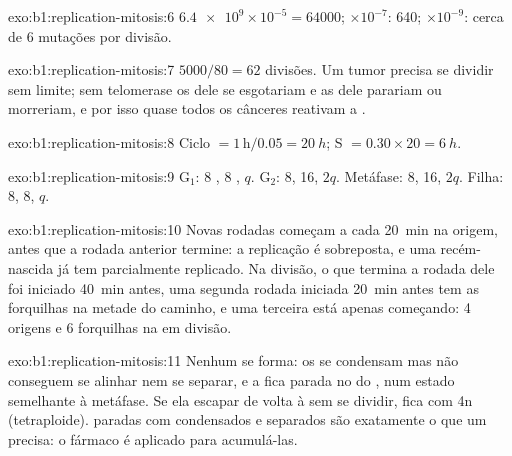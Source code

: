 \begin{solution}{exo:b1:replication-mitosis:6}
$\num{6.4e9}\times 10^{-5} = \num{64000}$; $\times 10^{-7}$: 640;
$\times 10^{-9}$: cerca de 6 mutações por divisão.
\end{solution}

\begin{solution}{exo:b1:replication-mitosis:7}
$5000/80 = 62$ divisões. Um tumor precisa se dividir sem limite; sem
telomerase os  dele se esgotariam e as  dele parariam ou
morreriam, e por isso quase todos os cânceres reativam a .
\end{solution}

\begin{solution}{exo:b1:replication-mitosis:8}
Ciclo $= 1\,\mathrm{h}/0.05 = \qty{20}{h}$; S $= 0.30\times 20 =
\qty{6}{h}$.
\end{solution}

\begin{solution}{exo:b1:replication-mitosis:9}
G$_1$: 8 , 8 , $q$. G$_2$: 8, 16, $2q$. Metáfase:
8, 16, $2q$. Filha: 8, 8, $q$.
\end{solution}

\begin{solution}{exo:b1:replication-mitosis:10}
Novas rodadas começam a cada \qty{20}{min} na origem, antes que a
rodada anterior termine: a replicação é sobreposta, e uma 
recém-nascida já tem  parcialmente replicado. Na divisão, o
 que termina a rodada dele foi iniciado \qty{40}{min} antes,
uma segunda rodada iniciada \qty{20}{min} antes tem as forquilhas na
metade do caminho, e uma terceira está apenas começando: 4 origens e 6
forquilhas na  em divisão.
\end{solution}

\begin{solution}{exo:b1:replication-mitosis:11}
Nenhum  se forma: os  se condensam mas não conseguem se
alinhar nem se separar, e a  fica parada no  do
, num estado semelhante à metáfase. Se ela escapar de volta à
 sem se dividir, fica com 4n  (tetraploide). 
paradas com  condensados e separados são exatamente o que um
 precisa: o fármaco é aplicado para acumulá-las.
\end{solution}

